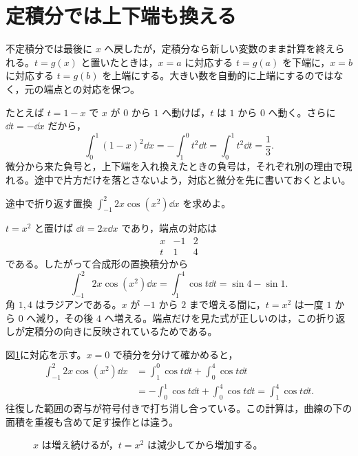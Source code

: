 \section{定積分では上下端も換える}\label{節:置換と積分区間}

不定積分では最後に $x$ へ戻したが，定積分なら新しい変数のまま計算を終えられる。$t=g(x)$ と置いたときは，$x=a$ に対応する $t=g(a)$ を下端に，$x=b$ に対応する $t=g(b)$ を上端にする。大きい数を自動的に上端にするのではなく，元の端点との対応を保つ。

たとえば $t=1-x$ で $x$ が $0$ から $1$ へ動けば，$t$ は $1$ から $0$ へ動く。さらに $\dd t=-\dd x$ だから，
\[
 \int_0^1(1-x)^2\dd x
 =-\int_1^0 t^2\dd t
 =\int_0^1t^2\dd t=\frac13.
\]
微分から来た負号と，上下端を入れ換えたときの負号は，それぞれ別の理由で現れる。途中で片方だけを落とさないよう，対応と微分を先に書いておくとよい。

\begin{example}{途中で折り返す置換}
$\int_{-1}^{2}2x\cos(x^2)\dd x$ を求めよ。
\end{example}

$t=x^2$ と置けば $\dd t=2x\dd x$ であり，端点の対応は
\[
 \begin{array}{c|cc}
 x&-1&2\\ \hline
 t&1&4
 \end{array}
\]
である。したがって合成形の置換積分から
\[
 \int_{-1}^{2}2x\cos(x^2)\dd x
 =\int_1^4\cos t\dd t
 =\sin4-\sin1.
\]
角 $1,4$ はラジアンである。$x$ が $-1$ から $2$ まで増える間に，$t=x^2$ は一度 $1$ から $0$ へ減り，その後 $4$ へ増える。端点だけを見た式が正しいのは，この折り返しが定積分の向きに反映されているためである。

図\ref{図:置換の折返し}に対応を示す。$x=0$ で積分を分けて確かめると，
\[
\begin{aligned}
 \int_{-1}^{2}2x\cos(x^2)\dd x
 &=\int_1^0\cos t\dd t+\int_0^4\cos t\dd t\\
 &=-\int_0^1\cos t\dd t+\int_0^4\cos t\dd t
 =\int_1^4\cos t\dd t.
\end{aligned}
\]
往復した範囲の寄与が符号付きで打ち消し合っている。この計算は，曲線の下の面積を重複も含めて足す操作とは違う。

\begin{figure}[htbp]
 \centering
 \caption{$x$ は増え続けるが，$t=x^2$ は減少してから増加する。}
 \label{図:置換の折返し}
\end{figure}

